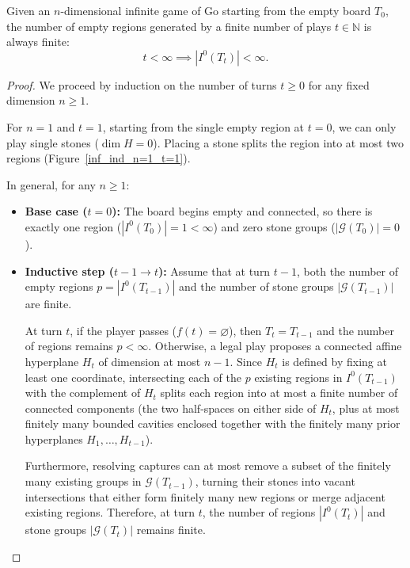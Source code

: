 \begin{theorem}
	Given an $n$-dimensional infinite game of Go starting from the empty board $T_0$, the number of empty regions generated by a finite number of plays $t \in \mathbb{N}$ is always finite:
	$$t < \infty \implies |I^0(T_t)| < \infty.$$
\end{theorem}
\begin{proof}
	We proceed by induction on the number of turns $t \ge 0$ for any fixed dimension $n \ge 1$.
	
	For $n=1$ and $t=1$, starting from the single empty region at $t=0$, we can only play single stones ($\dim H = 0$). Placing a stone splits the region into at most two regions (Figure~\ref{inf_ind_n=1_t=1}).
	
	In general, for any $n \ge 1$:
	\begin{itemize}
		\item \textbf{Base case ($t = 0$):} The board begins empty and connected, so there is exactly one region ($|I^0(T_0)| = 1 < \infty$) and zero stone groups ($|\mathcal{G}(T_0)| = 0$).
		\item \textbf{Inductive step ($t - 1 \to t$):} Assume that at turn $t - 1$, both the number of empty regions $p = |I^0(T_{t-1})|$ and the number of stone groups $|\mathcal{G}(T_{t-1})|$ are finite.
		
		At turn $t$, if the player passes ($f(t) = \varnothing$), then $T_t = T_{t-1}$ and the number of regions remains $p < \infty$. Otherwise, a legal play proposes a connected affine hyperplane $H_t$ of dimension at most $n - 1$. Since $H_t$ is defined by fixing at least one coordinate, intersecting each of the $p$ existing regions in $I^0(T_{t-1})$ with the complement of $H_t$ splits each region into at most a finite number of connected components (the two half-spaces on either side of $H_t$, plus at most finitely many bounded cavities enclosed together with the finitely many prior hyperplanes $H_1, \dots, H_{t-1}$).
		
		Furthermore, resolving captures can at most remove a subset of the finitely many existing groups in $\mathcal{G}(T_{t-1})$, turning their stones into vacant intersections that either form finitely many new regions or merge adjacent existing regions. Therefore, at turn $t$, the number of regions $|I^0(T_t)|$ and stone groups $|\mathcal{G}(T_t)|$ remains finite.
	\end{itemize}
\end{proof}


